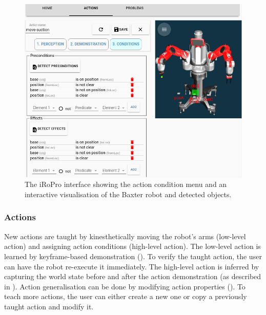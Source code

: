 \begin{figure}[h]
	\includegraphics[width=\linewidth]{figures/gui.png}
	\caption{The iRoPro interface showing the action condition menu and an interactive visualisation of the Baxter robot and detected objects.}\label{fig:gui-action-3}%
\end{figure}

\subsubsection{Actions} New actions are taught by kinesthetically moving the robot's arms (low-level action) and assigning action conditions (high-level action).
The low-level action is learned %
by keyframe-based demonstration ().
To verify the taught action, the user can have the robot re-execute it immediately.
The high-level action is inferred by capturing the world state before and after the action demonstration (as described in ).
Action generalisation can be done by modifying action properties ().
To teach more actions, the user can either create a new one or copy a previously taught action and modify it.
